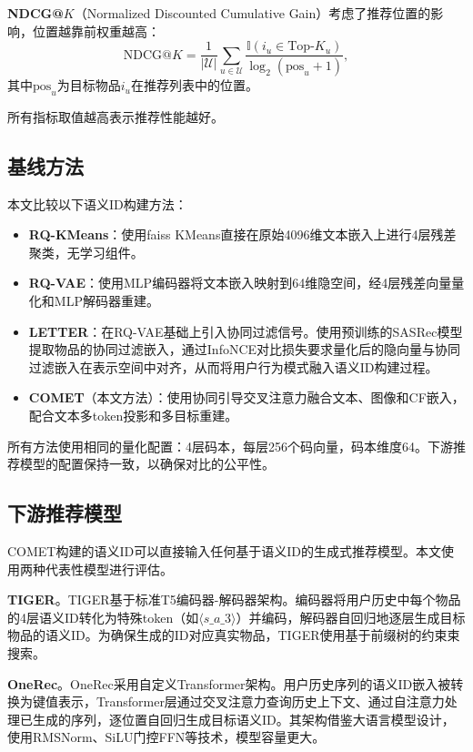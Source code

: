 \textbf{NDCG@$K$}（Normalized Discounted Cumulative Gain）考虑了推荐位置的影响，位置越靠前权重越高：
\begin{equation}
  \text{NDCG@}K = \frac{1}{|\mathcal{U}|} \sum_{u \in \mathcal{U}} \frac{\mathbb{I}(i_u \in \text{Top-}K_u)}{\log_2(\text{pos}_u+1)},
\end{equation}
其中$\text{pos}_u$为目标物品$i_u$在推荐列表中的位置。

所有指标取值越高表示推荐性能越好。

\subsection{基线方法}

本文比较以下语义ID构建方法：

\begin{itemize}
  \item \textbf{RQ-KMeans}\cite{onerec}：使用faiss KMeans直接在原始4096维文本嵌入上进行4层残差聚类，无学习组件。
  \item \textbf{RQ-VAE}\cite{lee2022autoregressive}：使用MLP编码器将文本嵌入映射到64维隐空间，经4层残差向量量化和MLP解码器重建。
  \item \textbf{LETTER}\cite{wang2024learnable}：在RQ-VAE基础上引入协同过滤信号。使用预训练的SASRec模型提取物品的协同过滤嵌入，通过InfoNCE对比损失要求量化后的隐向量与协同过滤嵌入在表示空间中对齐，从而将用户行为模式融入语义ID构建过程。
  \item \textbf{COMET}（本文方法）：使用协同引导交叉注意力融合文本、图像和CF嵌入，配合文本多token投影和多目标重建。
\end{itemize}

所有方法使用相同的量化配置：4层码本，每层256个码向量，码本维度64。下游推荐模型的配置保持一致，以确保对比的公平性。

\subsection{下游推荐模型}

COMET构建的语义ID可以直接输入任何基于语义ID的生成式推荐模型。本文使用两种代表性模型进行评估。

\textbf{TIGER}。TIGER\cite{rajput2023recommender}基于标准T5\cite{raffel2020exploring}编码器-解码器架构。编码器将用户历史中每个物品的4层语义ID转化为特殊token（如$\langle s\_a\_3 \rangle$）并编码，解码器自回归地逐层生成目标物品的语义ID。为确保生成的ID对应真实物品，TIGER使用基于前缀树的约束束搜索。

\textbf{OneRec}。OneRec\cite{onerec}采用自定义Transformer架构。用户历史序列的语义ID嵌入被转换为键值表示，Transformer层通过交叉注意力查询历史上下文、通过自注意力处理已生成的序列，逐位置自回归生成目标语义ID。其架构借鉴大语言模型设计，使用RMSNorm、SiLU门控FFN等技术，模型容量更大。

